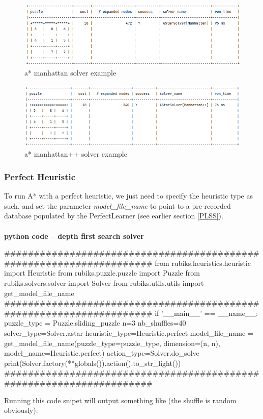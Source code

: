 \begin{figure}[H]
\centering
\includegraphics[scale=0.5]{./Figures/exampleastarmanhattansolver}
\caption[Examples]{a* manhattan solver example}
\label{fig:exampleastarmanhattansolver}
\end{figure}

\begin{figure}[H]
\centering
\includegraphics[scale=0.5]{./Figures/exampleastarmanhattanplussolver}
\caption[Examples]{a* manhattan++ solver example}
\label{fig:exampleastarmanhattanplussolver}
\end{figure}



\subsubsection{Perfect Heuristic}
To run A{*} with a perfect heuristic, we just need to specify the heuristic type as such, and set the parameter \textit{model\_file\_name} to point to a pre-recorded database populated by the PerfectLearner (see earlier section \ref{PLSS}).


\afblue
\paragraph{}{\textbf{python code -- depth first search solver}}
\begin{python}
####################################################################
from rubiks.heuristics.heuristic import Heuristic
from rubiks.puzzle.puzzle import Puzzle
from rubiks.solvers.solver import Solver
from rubiks.utils.utils import get_model_file_name
####################################################################
if '__main__' == __name__:
    puzzle_type = Puzzle.sliding_puzzle
    n=3
    nb_shuffles=40
    solver_type=Solver.astar
    heuristic_type=Heuristic.perfect
    model_file_name = get_model_file_name(puzzle_type=puzzle_type,
                                          dimension=(n, n),
                                          model_name=Heuristic.perfect)
    action_type=Solver.do_solve
    print(Solver.factory(**globals()).action().to_str_light())
####################################################################
\end{python}
\black
Running this code snipet will output something like (the shuffle is random obviously):


